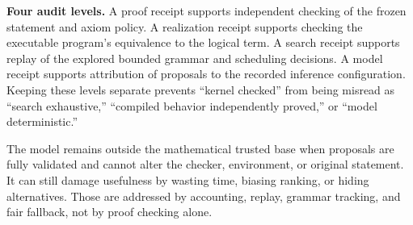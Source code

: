 \textbf{Four audit levels.} A proof receipt supports independent checking of the frozen statement and axiom policy. A realization receipt supports checking the executable program's equivalence to the logical term. A search receipt supports replay of the explored bounded grammar and scheduling decisions. A model receipt supports attribution of proposals to the recorded inference configuration. Keeping these levels separate prevents ``kernel checked'' from being misread as ``search exhaustive,'' ``compiled behavior independently proved,'' or ``model deterministic.''

The model remains outside the mathematical trusted base when proposals are fully validated and cannot alter the checker, environment, or original statement. It can still damage usefulness by wasting time, biasing ranking, or hiding alternatives. Those are addressed by accounting, replay, grammar tracking, and fair fallback, not by proof checking alone.

